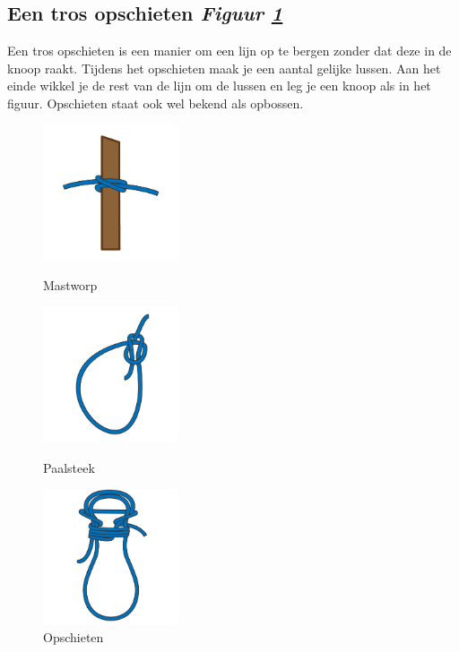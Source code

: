 \subsection{Een tros opschieten \hfill \textit{Figuur \ref{pic:opschieten}}}
Een tros opschieten is een manier om een lijn op te bergen zonder dat deze in de knoop raakt. Tijdens het opschieten maak je een aantal gelijke lussen. Aan het einde wikkel je de rest van de lijn om de lussen en leg je een knoop als in het figuur. Opschieten staat ook wel bekend als opbossen.
\begin{figure}[h]
  \centering
  \begin{minipage}[b]{0.32\textwidth}
  \centering
    \includegraphics[height=4cm]{Hoofdstukken/Schiemannen/pdf/mastworp.pdf}
    \caption{Mastworp}
    \label{pic:mastworp}
  \end{minipage}
  \hfill
  \begin{minipage}[b]{0.32\textwidth}
    \centering
    \includegraphics[height=4cm]{Hoofdstukken/Schiemannen/pdf/paalsteek.pdf}
    \caption{Paalsteek}
    \label{pic:paal_steek}
    \end{minipage}
  \hfill
   \begin{minipage}[b]{0.32\textwidth}
    \centering
    \includegraphics[height=4cm]{Hoofdstukken/Schiemannen/pdf/opbossen.pdf}
    \caption{Opschieten}
    \label{pic:opschieten}
    \end{minipage}
\end{figure}


